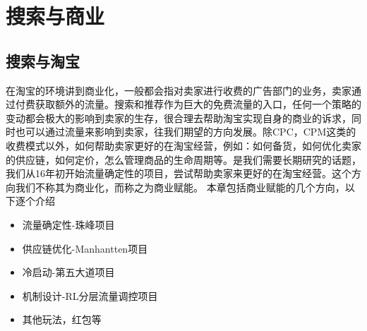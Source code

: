 
\chapter{搜索与商业}
\thispagestyle{empty}

\setlength{\fboxrule}{0pt}\setlength{\fboxsep}{0cm}
\noindent\shadowbox{
\begin{tcolorbox}[arc=0mm,colback=lightblue,colframe=darkblue,title=学习目标与要求]

\end{tcolorbox}}
\setlength{\fboxrule}{1pt}\setlength{\fboxsep}{4pt} 

\section{搜索与淘宝} 
在淘宝的环境讲到商业化，一般都会指对卖家进行收费的广告部门的业务，卖家通过付费获取额外的流量。搜索和推荐作为巨大的免费流量的入口，任何一个策略的变动都会极大的影响到卖家的生存，很合理去帮助淘宝实现自身的商业的诉求，同时也可以通过流量来影响到卖家，往我们期望的方向发展。除CPC，CPM这类的收费模式以外，如何帮助卖家更好的在淘宝经营，例如：如何备货，如何优化卖家的供应链，如何定价，怎么管理商品的生命周期等。是我们需要长期研究的话题，我们从16年初开始流量确定性的项目，尝试帮助卖家来更好的在淘宝经营。这个方向我们不称其为商业化，而称之为商业赋能。
\newline 本章包括商业赋能的几个方向，以下逐个介绍
\begin{itemize}
\item 流量确定性-珠峰项目
\item 供应链优化-Manhantten项目
\item 冷启动-第五大道项目
\item 机制设计-RL分层流量调控项目
\item 其他玩法，红包等
\end{itemize}

